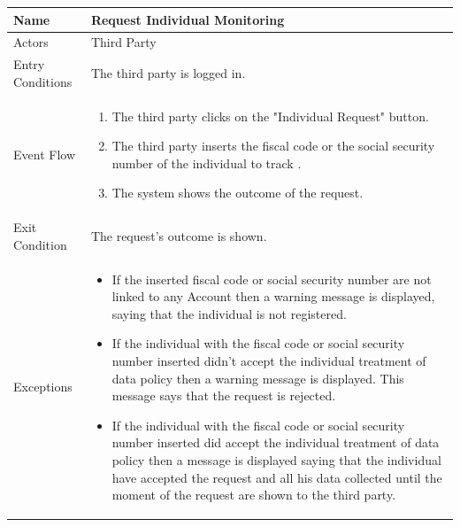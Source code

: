 \begin{enumerate}
\FloatBarrier
\begin{table}[h]
\begin{tabular}{|l|p{}|}
\hline
Name             & Request Individual Monitoring \\ \hline
Actors           & Third Party  \\ \hline
Entry Conditions & The third party is logged in.    \\ \hline
Event Flow       & \begin{enumerate}
            \item The third party clicks on the "Individual Request" button.
            \item The third party inserts the fiscal code or the social security number of the individual to track .
            \item The system shows the outcome of the request. 
        \end{enumerate}\\ \hline
Exit Condition   & The request's outcome is shown.\\ \hline
Exceptions       & \begin{itemize}
\item If the inserted fiscal code or social security number are not linked to any Account then a warning message is displayed, saying that the individual is not registered.
\item If the individual with the fiscal code or social security number inserted didn't accept the individual treatment of data policy then a warning message is displayed. This message says that the request is rejected.
\item If the individual with the fiscal code or social security number inserted did accept the individual treatment of data policy then a message is displayed saying that the individual have accepted the request and all his data collected until the moment of the request are shown to the third party.
\end{itemize}\\ \hline
\end{tabular}
\end{table}
\FloatBarrier


\end{enumerate}
